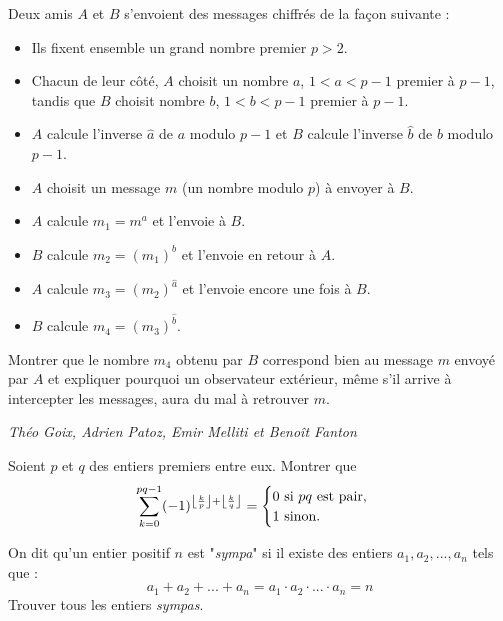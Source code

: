 \begin{exo}{}
Deux amis $A$ et $B$ s'envoient des messages chiffr\'es de la fa\c con suivante :
{\small
\begin{itemize}
\item Ils fixent ensemble un grand nombre premier $p>2$.
\item Chacun de leur c\^ot\'e, $A$ choisit un nombre $a$, $1 < a < p-1$ premier \`a $p-1$, tandis que $B$ choisit nombre $b$, $1<b<p-1$ premier \`a $p-1$.
\item $A$ calcule l'inverse $\widehat{a}$ de $a$ modulo $p-1$ et $B$ calcule l'inverse $\widehat{b}$ de $b$ modulo $p-1$.
\item $A$ choisit un message $m$ (un nombre modulo $p$) \`a envoyer \`a $B$.
\item $A$ calcule $m_1=m^{a}$ et l'envoie \`a $B$.
\item $B$ calcule $m_2=(m_1)^{b}$ et l'envoie en retour \`a $A$.
\item $A$ calcule $m_3=(m_2)^{\widehat{a}}$ et l'envoie encore une fois \`a $B$.
\item $B$ calcule $m_4=(m_3)^{\widehat{b}}$.
\end{itemize}}
Montrer que le nombre $m_4$ obtenu par $B$ correspond bien au message $m$ envoy\'e par $A$ et expliquer pourquoi un observateur ext\'erieur, m\^eme s'il arrive \`a intercepter les messages, aura du mal \`a retrouver $m$.

\medskip
\textit{Théo Goix, Adrien Patoz, Emir Melliti et Benoît Fanton }
\end{exo}


\begin{exo}{}
Soient $p$ et $q$ des entiers premiers entre eux. Montrer que
\[\displaystyle{ \sum_{k=0}^{pq-1} (-1)^{\left\lfloor \frac{k}{p}\right\rfloor + \left\lfloor \frac{k}{q}\right\rfloor} = \begin{cases} 0 \textnormal{ si } pq \textnormal{ est pair,}\\ 1 \textnormal{ sinon.}\end{cases}}\]
\end{exo}


\begin{exo}{}
On dit qu'un entier positif $n$ est "\textit{sympa}" si il existe des entiers $a_1,a_2,...,a_n$ tels que :
$$a_1+a_2+...+a_n=a_1\cdot a_2 \cdot ...\cdot a_n=n$$
Trouver tous les entiers \textit{sympas}.

\end{exo}


